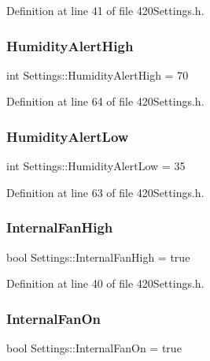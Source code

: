 Definition at line 41 of file 420\+Settings.\+h.

\mbox{\label{struct_settings_a13511927e8e41fbe768f5629bba2e92b}} 
\subsubsection{\texorpdfstring{HumidityAlertHigh}{HumidityAlertHigh}}
{\footnotesize\ttfamily int Settings\+::\+Humidity\+Alert\+High = 70}



Definition at line 64 of file 420\+Settings.\+h.

\mbox{\label{struct_settings_a309c0556e0a03513e80ae4265ee92f80}} 
\subsubsection{\texorpdfstring{HumidityAlertLow}{HumidityAlertLow}}
{\footnotesize\ttfamily int Settings\+::\+Humidity\+Alert\+Low = 35}



Definition at line 63 of file 420\+Settings.\+h.

\mbox{\label{struct_settings_a986e7961f12dc3e18e3d6f1623b692de}} 
\subsubsection{\texorpdfstring{InternalFanHigh}{InternalFanHigh}}
{\footnotesize\ttfamily bool Settings\+::\+Internal\+Fan\+High = true}



Definition at line 40 of file 420\+Settings.\+h.

\mbox{\label{struct_settings_aa804a748ef28e4c9fcd8465471793384}} 
\subsubsection{\texorpdfstring{InternalFanOn}{InternalFanOn}}
{\footnotesize\ttfamily bool Settings\+::\+Internal\+Fan\+On = true}



